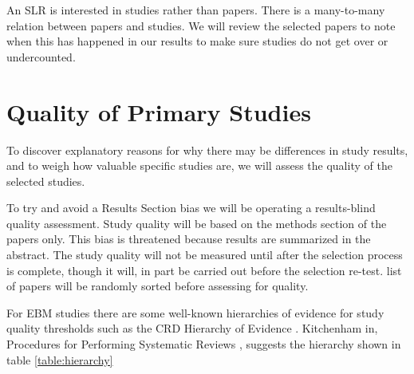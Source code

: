 An SLR is interested in studies rather than papers.
There is a many-to-many relation between papers and studies.
We will review the selected papers to note when this has happened in our results to make sure studies do not get over or undercounted.

\section{Quality of Primary Studies}
To discover explanatory reasons for why there may be differences in study results, and to weigh how valuable specific studies are, we will assess the quality of the selected studies.

To try and avoid a Results Section bias we will be operating a results-blind quality assessment.  
Study quality will be based on the methods section of the papers only.
This bias is threatened because results are summarized in the abstract.  
The study quality will not be measured until after the selection process is complete, though it will, in part be carried out before the selection re-test.
list of papers will be randomly sorted before assessing for quality.

For EBM studies there are some well-known hierarchies of evidence for study quality thresholds such as the CRD Hierarchy of Evidence \cite{Cochrane_2019}.
Kitchenham in, Procedures for Performing Systematic Reviews \cite{Kitchenham_2004_2}, suggests the hierarchy shown in table \ref{table:hierarchy}

